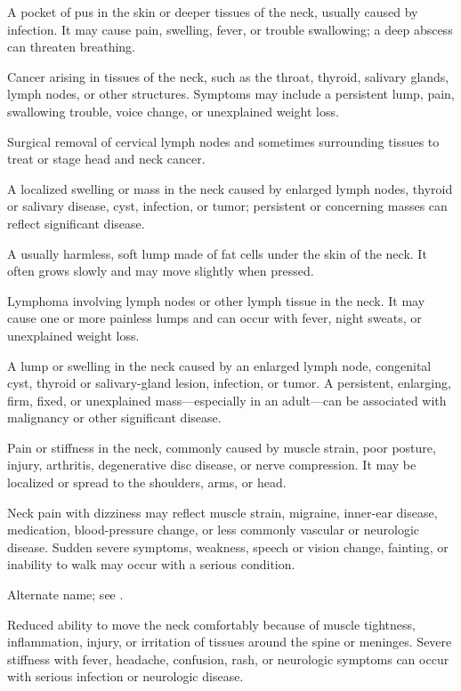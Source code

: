  A pocket of pus in the skin or deeper tissues of the neck, usually caused by infection. It may cause pain, swelling, fever, or trouble swallowing; a deep abscess can threaten breathing.

 Cancer arising in tissues of the neck, such as the throat, thyroid, salivary glands, lymph nodes, or other structures. Symptoms may include a persistent lump, pain, swallowing trouble, voice change, or unexplained weight loss.

 Surgical removal of cervical lymph nodes and sometimes surrounding tissues to treat or stage head and neck cancer.

 A localized swelling or mass in the neck caused by enlarged lymph nodes, thyroid or salivary disease, cyst, infection, or tumor; persistent or concerning masses can reflect significant disease.

 A usually harmless, soft lump made of fat cells under the skin of the neck. It often grows slowly and may move slightly when pressed.

 Lymphoma involving lymph nodes or other lymph tissue in the neck. It may cause one or more painless lumps and can occur with fever, night sweats, or unexplained weight loss.

 A lump or swelling in the neck caused by an enlarged lymph node, congenital cyst, thyroid or salivary-gland lesion, infection, or tumor. A persistent, enlarging, firm, fixed, or unexplained mass—especially in an adult—can be associated with malignancy or other significant disease.

 Pain or stiffness in the neck, commonly caused by muscle strain, poor posture, injury, arthritis, degenerative disc disease, or nerve compression. It may be localized or spread to the shoulders, arms, or head.

 Neck pain with dizziness may reflect muscle strain, migraine, inner-ear disease, medication, blood-pressure change, or less commonly vascular or neurologic disease. Sudden severe symptoms, weakness, speech or vision change, fainting, or inability to walk may occur with a serious condition.

 Alternate name; see .

 Reduced ability to move the neck comfortably because of muscle tightness, inflammation, injury, or irritation of tissues around the spine or meninges. Severe stiffness with fever, headache, confusion, rash, or neurologic symptoms can occur with serious infection or neurologic disease.

